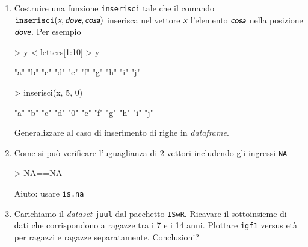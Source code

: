 \documentclass[onecolumn,11pt]{book}
\newcommand{\varia}[1]{\textsl{\textsf{#1}}}
\begin{document}
 
\begin{enumerate}
\item{} Costruire una funzione \texttt{inserisci} tale che il comando
$\texttt{inserisci}(\varia{x}, \varia{dove},\varia{cosa})$ inserisca nel vettore $\varia{x}$ l'elemento $\varia{cosa}$ nella posizione $\varia{dove}$. 
Per esempio
\begin{Schunk}
\begin{Sinput}
> y <-letters[1:10] 
> y
\end{Sinput}
\begin{Soutput}
 [1] "a" "b" "c" "d" "e" "f" "g" "h" "i" "j"
\end{Soutput}
\end{Schunk}
\begin{Schunk}
\begin{Sinput}
> inserisci(x, 5, 0)
\end{Sinput}
\end{Schunk}
\begin{Schunk}
\begin{Soutput}
 [1] "a" "b" "c" "d" "0" "e" "f" "g" "h" "i" "j"
\end{Soutput}
\end{Schunk}
Generalizzare  al caso di inserimento di righe in \emph{dataframe}.
\item{}
Come si pu\`o verificare l'uguaglianza di 2 vettori includendo gli ingressi \texttt{NA}
\begin{Schunk}
\begin{Sinput}
> NA==NA
\end{Sinput}
\end{Schunk}
Aiuto: usare \texttt{is.na}
\item{}
Carichiamo il \emph{dataset} \texttt{juul} dal pacchetto \texttt{ISwR}. Ricavare il sottoinsieme di dati che corrispondono a ragazze tra i 7 e i 14 anni. Plottare \texttt{igf1} versus et\`a per ragazzi e ragazze separatamente. Conclusioni?
\end{enumerate}
 
 
\end{document}
